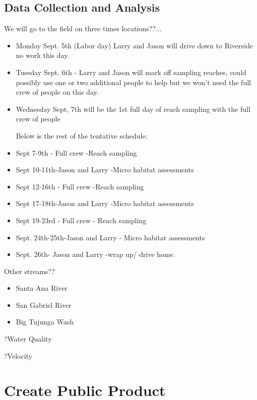 \documentclass{tufte-handout}\usepackage[]{graphicx}\usepackage[]{color}
\begin{document}
\subsection{Data Collection and Analysis}

We will go to the field on three times locations??...

\begin{itemize}
\item Monday Sept. 5th (Labor day) Larry and Jason will drive down to Riverside no work this day.
\item Tuesday Sept. 6th - Larry and Jason will mark off sampling reaches, could possibly use one or two additional people to help but we won't need the full crew of people on this day. 
\item Wednesday Sept, 7th will be the 1st full day of reach sampling with the full crew of people

Below is the rest of the tentative schedule:

\item Sept 7-9th - Full crew -Reach sampling
\item Sept 10-11th-Jason and Larry -Micro habitat assessments
\item Sept 12-16th - Full crew -Reach sampling
\item Sept 17-18th-Jason and Larry -Micro habitat assessments

\item Sept 19-23rd - Full crew - Reach sampling
\item Sept. 24th-25th-Jason and Larry - Micro habitat assessments
\item Sept. 26th- Jason and Larry -wrap up/ drive home.
\end{itemize}

Other streams??

\begin{itemize}
  \item Santa Ana River
  \item San Gabriel River
  \item Big Tujunga Wash
\end{itemize}


?Water Quality

?Velocity








\section{Create Public Product}
\end{document}
